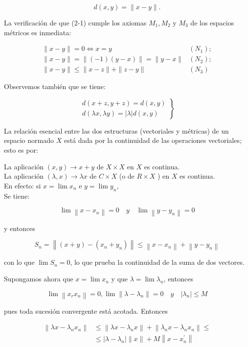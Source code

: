 \documentclass[10pt]{article}
\theoremstyle{plain}
\theoremstyle{definition}
\theoremstyle{remark}
\begin{document}
\begin{equation*}
d(x, y)=\|x-y\| . \tag{2-1}
\end{equation*}


La verificación de que (2-1) cumple los axiomas $M_{1}, M_{2}$ y $M_{3}$ de los espacios métricos es inmediata:

$$
\begin{array}{ll}
\|x-y\|=0 \Longleftrightarrow x=y & \left(N_{1}\right) ; \\
\|x-y\|=\|(-1)(y-x)\|=\|y-x\| & \left(N_{2}\right) ; \\
\|x-y\| \leqslant\|x-z\|+\|z-y\| & \left(N_{3}\right)
\end{array}
$$

Observemos también que se tiene:

\[
\left.\begin{array}{l}
d(x+z, y+z)=d(x, y)  \tag{2-2}\\
d(\lambda x, \lambda y)=|\lambda| d(x, y)
\end{array}\right\}
\]

La relación esencial entre las dos estructuras (vectoriales y métricas) de un espacio normado $X$ está dada por la continuidad de las operaciones vectoriales; esto es por:

La aplicación $(x, y) \rightarrow x+y$ de $X \times X$ en $X$ es continua.\\
La aplicación $(\lambda, x) \rightarrow \lambda x$ de $C \times X$ (o de $R \times X$ ) en $X$ es continua.\\
En efecto: si $x=\lim x_{n}$ e $y=\lim y_{n}$,\\
Se tiene:

$$
\lim \left\|x-x_{n}\right\|=0 \quad y \quad \lim \left\|y-y_{n}\right\|=0
$$

y entonces

$$
S_{n}=\left\|(x+y)-\left(x_{n}+y_{n}\right)\right\| \leqslant\left\|x-x_{n}\right\|+\left\|y-y_{n}\right\|
$$

con lo que $\lim S_{n}=0$, lo que prueba la continuidad de la suma de dos vectores.

Supongamos ahora que $x=\lim x_{n}$ y que $\lambda=\lim \lambda_{n}$, entonces

$$
\lim \left\|x_{r} x_{n}\right\|=0, \lim \left\|\lambda-\lambda_{n}\right\|=0 \quad y \quad\left|\lambda_{n}\right| \leqslant M
$$

pues toda sucesión convergente está acotada. Entonces

$$
\begin{aligned}
\left\|\lambda x-\lambda_{n} x_{n}\right\| & \leqslant\left\|\lambda x-\lambda_{n} x\right\|+\left\|\lambda_{n} x-\lambda_{n} x_{n}\right\| \leqslant \\
& \leqslant\left|\lambda-\lambda_{n}\right|\|x\|+M\left\|x-x_{n}^{\prime}\right\|
\end{aligned}
$$
\end{document}
